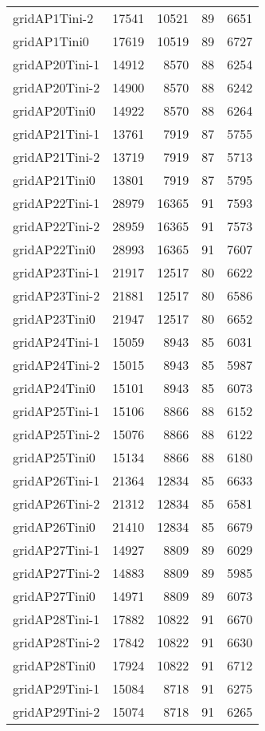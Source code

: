 \begin{longtable}{lrrrr}
gridAP1Tini-2 & 17541 & 10521 & 89 & 6651 \\
gridAP1Tini0 & 17619 & 10519 & 89 & 6727 \\
gridAP20Tini-1 & 14912 & 8570 & 88 & 6254 \\
gridAP20Tini-2 & 14900 & 8570 & 88 & 6242 \\
gridAP20Tini0 & 14922 & 8570 & 88 & 6264 \\
gridAP21Tini-1 & 13761 & 7919 & 87 & 5755 \\
gridAP21Tini-2 & 13719 & 7919 & 87 & 5713 \\
gridAP21Tini0 & 13801 & 7919 & 87 & 5795 \\
gridAP22Tini-1 & 28979 & 16365 & 91 & 7593 \\
gridAP22Tini-2 & 28959 & 16365 & 91 & 7573 \\
gridAP22Tini0 & 28993 & 16365 & 91 & 7607 \\
gridAP23Tini-1 & 21917 & 12517 & 80 & 6622 \\
gridAP23Tini-2 & 21881 & 12517 & 80 & 6586 \\
gridAP23Tini0 & 21947 & 12517 & 80 & 6652 \\
gridAP24Tini-1 & 15059 & 8943 & 85 & 6031 \\
gridAP24Tini-2 & 15015 & 8943 & 85 & 5987 \\
gridAP24Tini0 & 15101 & 8943 & 85 & 6073 \\
gridAP25Tini-1 & 15106 & 8866 & 88 & 6152 \\
gridAP25Tini-2 & 15076 & 8866 & 88 & 6122 \\
gridAP25Tini0 & 15134 & 8866 & 88 & 6180 \\
gridAP26Tini-1 & 21364 & 12834 & 85 & 6633 \\
gridAP26Tini-2 & 21312 & 12834 & 85 & 6581 \\
gridAP26Tini0 & 21410 & 12834 & 85 & 6679 \\
gridAP27Tini-1 & 14927 & 8809 & 89 & 6029 \\
gridAP27Tini-2 & 14883 & 8809 & 89 & 5985 \\
gridAP27Tini0 & 14971 & 8809 & 89 & 6073 \\
gridAP28Tini-1 & 17882 & 10822 & 91 & 6670 \\
gridAP28Tini-2 & 17842 & 10822 & 91 & 6630 \\
gridAP28Tini0 & 17924 & 10822 & 91 & 6712 \\
gridAP29Tini-1 & 15084 & 8718 & 91 & 6275 \\
gridAP29Tini-2 & 15074 & 8718 & 91 & 6265 \\

\end{longtable}
